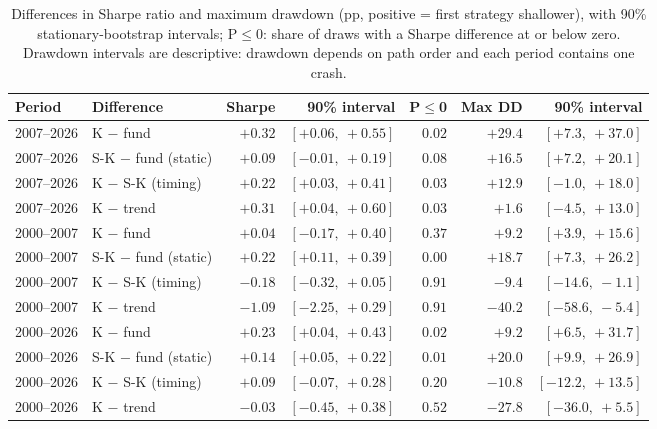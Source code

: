 \documentclass[11pt,a4paper]{article}
\begin{document}
\begin{table}[htbp]
\centering
\caption{Differences in Sharpe ratio and maximum drawdown (pp, positive = first strategy shallower), with 90\%
stationary-bootstrap intervals; P$\le$0: share of draws with a Sharpe difference at or below zero. Drawdown
intervals are descriptive: drawdown depends on path order and each period contains one crash.}
\label{tab:boot}
\footnotesize
\setlength{\tabcolsep}{4pt}
\begin{tabular}{@{}llrrrrr@{}}
\toprule
Period & Difference & Sharpe & 90\% interval & P$\le$0 & Max DD & 90\% interval \\
\midrule
2007--2026 & K $-$ fund & $+0.32$ & $[+0.06,\ +0.55]$ & $0.02$ & $+29.4$ & $[+7.3,\ +37.0]$ \\
2007--2026 & S-K $-$ fund (static) & $+0.09$ & $[-0.01,\ +0.19]$ & $0.08$ & $+16.5$ & $[+7.2,\ +20.1]$ \\
2007--2026 & K $-$ S-K (timing) & $+0.22$ & $[+0.03,\ +0.41]$ & $0.03$ & $+12.9$ & $[-1.0,\ +18.0]$ \\
2007--2026 & K $-$ trend & $+0.31$ & $[+0.04,\ +0.60]$ & $0.03$ & $+1.6$ & $[-4.5,\ +13.0]$ \\
\midrule
2000--2007 & K $-$ fund & $+0.04$ & $[-0.17,\ +0.40]$ & $0.37$ & $+9.2$ & $[+3.9,\ +15.6]$ \\
2000--2007 & S-K $-$ fund (static) & $+0.22$ & $[+0.11,\ +0.39]$ & $0.00$ & $+18.7$ & $[+7.3,\ +26.2]$ \\
2000--2007 & K $-$ S-K (timing) & $-0.18$ & $[-0.32,\ +0.05]$ & $0.91$ & $-9.4$ & $[-14.6,\ -1.1]$ \\
2000--2007 & K $-$ trend & $-1.09$ & $[-2.25,\ +0.29]$ & $0.91$ & $-40.2$ & $[-58.6,\ -5.4]$ \\
\midrule
2000--2026 & K $-$ fund & $+0.23$ & $[+0.04,\ +0.43]$ & $0.02$ & $+9.2$ & $[+6.5,\ +31.7]$ \\
2000--2026 & S-K $-$ fund (static) & $+0.14$ & $[+0.05,\ +0.22]$ & $0.01$ & $+20.0$ & $[+9.9,\ +26.9]$ \\
2000--2026 & K $-$ S-K (timing) & $+0.09$ & $[-0.07,\ +0.28]$ & $0.20$ & $-10.8$ & $[-12.2,\ +13.5]$ \\
2000--2026 & K $-$ trend & $-0.03$ & $[-0.45,\ +0.38]$ & $0.52$ & $-27.8$ & $[-36.0,\ +5.5]$ \\
\bottomrule
\end{tabular}
\end{table}
\end{document}
